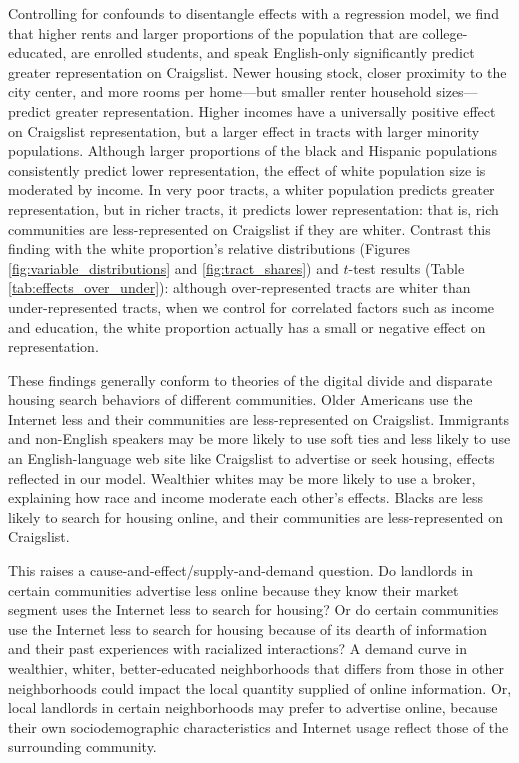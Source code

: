 \documentclass[11pt,onecolumn]{article} %
\begin{document}
Controlling for confounds to disentangle effects with a regression model, we find that higher rents and larger proportions of the population that are college-educated, are enrolled students, and speak English-only significantly predict greater representation on Craigslist. Newer housing stock, closer proximity to the city center, and more rooms per home---but smaller renter household sizes---predict greater representation. Higher incomes have a universally positive effect on Craigslist representation, but a larger effect in tracts with larger minority populations. Although larger proportions of the black and Hispanic populations consistently predict lower representation, the effect of white population size is moderated by income. In very poor tracts, a whiter population predicts greater representation, but in richer tracts, it predicts lower representation: that is, rich communities are less-represented on Craigslist if they are whiter. Contrast this finding with the white proportion's relative distributions (Figures \ref{fig:variable_distributions} and \ref{fig:tract_shares}) and $t$-test results (Table \ref{tab:effects_over_under}): although over-represented tracts are whiter than under-represented tracts, when we control for correlated factors such as income and education, the white proportion actually has a small or negative effect on representation.

These findings generally conform to theories of the digital divide and disparate housing search behaviors of different communities. Older Americans use the Internet less and their communities are less-represented on Craigslist. Immigrants and non-English speakers may be more likely to use soft ties and less likely to use an English-language web site like Craigslist to advertise or seek housing, effects reflected in our model. Wealthier whites may be more likely to use a broker, explaining how race and income moderate each other's effects. Blacks are less likely to search for housing online, and their communities are less-represented on Craigslist.

This raises a cause-and-effect/supply-and-demand question. Do landlords in certain communities advertise less online because they know their market segment uses the Internet less to search for housing? Or do certain communities use the Internet less to search for housing because of its dearth of information and their past experiences with racialized interactions? A demand curve in wealthier, whiter, better-educated neighborhoods that differs from those in other neighborhoods could impact the local quantity supplied of online information. Or, local landlords in certain neighborhoods may prefer to advertise online, because their own sociodemographic characteristics and Internet usage reflect those of the surrounding community.
\end{document}
